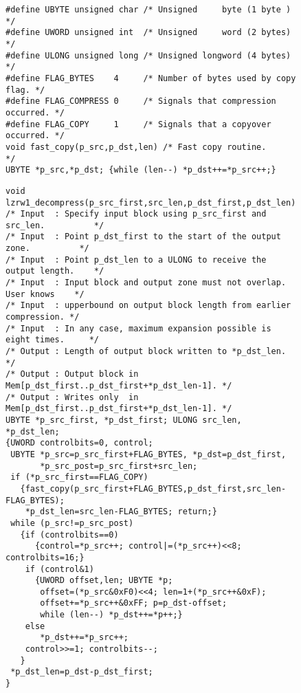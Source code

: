 \begin{figure}
\startsmall
\begin{verbatim}
#define UBYTE unsigned char /* Unsigned     byte (1 byte )        */
#define UWORD unsigned int  /* Unsigned     word (2 bytes)        */
#define ULONG unsigned long /* Unsigned longword (4 bytes)        */
#define FLAG_BYTES    4     /* Number of bytes used by copy flag. */
#define FLAG_COMPRESS 0     /* Signals that compression occurred. */
#define FLAG_COPY     1     /* Signals that a copyover  occurred. */
void fast_copy(p_src,p_dst,len) /* Fast copy routine.             */
UBYTE *p_src,*p_dst; {while (len--) *p_dst++=*p_src++;}
\end{verbatim}
\endsmall
{}
\end{figure}

\begin{figure}
\startsmall
\begin{verbatim}
void lzrw1_decompress(p_src_first,src_len,p_dst_first,p_dst_len)
/* Input  : Specify input block using p_src_first and src_len.          */
/* Input  : Point p_dst_first to the start of the output zone.          */
/* Input  : Point p_dst_len to a ULONG to receive the output length.    */
/* Input  : Input block and output zone must not overlap. User knows    */
/* Input  : upperbound on output block length from earlier compression. */
/* Input  : In any case, maximum expansion possible is eight times.     */
/* Output : Length of output block written to *p_dst_len.               */
/* Output : Output block in Mem[p_dst_first..p_dst_first+*p_dst_len-1]. */
/* Output : Writes only  in Mem[p_dst_first..p_dst_first+*p_dst_len-1]. */
UBYTE *p_src_first, *p_dst_first; ULONG src_len, *p_dst_len;
{UWORD controlbits=0, control;
 UBYTE *p_src=p_src_first+FLAG_BYTES, *p_dst=p_dst_first,
       *p_src_post=p_src_first+src_len;
 if (*p_src_first==FLAG_COPY)
   {fast_copy(p_src_first+FLAG_BYTES,p_dst_first,src_len-FLAG_BYTES);
    *p_dst_len=src_len-FLAG_BYTES; return;}
 while (p_src!=p_src_post)
   {if (controlbits==0)
      {control=*p_src++; control|=(*p_src++)<<8; controlbits=16;}
    if (control&1)
      {UWORD offset,len; UBYTE *p;
       offset=(*p_src&0xF0)<<4; len=1+(*p_src++&0xF);
       offset+=*p_src++&0xFF; p=p_dst-offset;
       while (len--) *p_dst++=*p++;}
    else
       *p_dst++=*p_src++;
    control>>=1; controlbits--;
   }
 *p_dst_len=p_dst-p_dst_first;
}
\end{verbatim}
\endsmall
{}
\end{figure}


